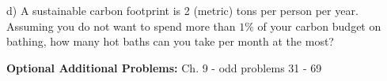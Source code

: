 \documentclass[11pt]{article}
\begin{document}
d) A sustainable carbon footprint is 2 (metric) tons per person per year. Assuming you do not want
 to spend more than $1\%$ of your carbon budget on bathing, how many hot baths can you take per month
 at the most?

\vfill
\textbf{Optional Additional Problems:} Ch. 9 - odd problems 31 - 69

%
%
%
%
%
%
\end{document}
